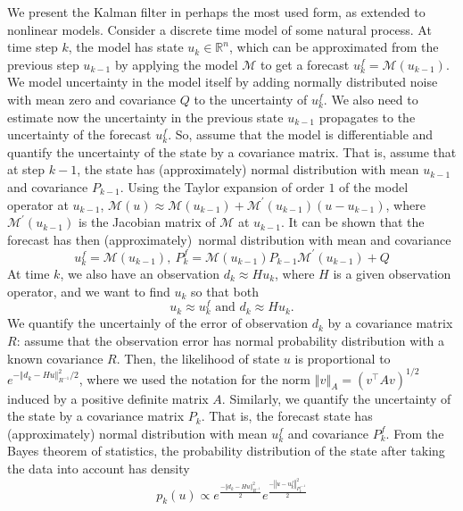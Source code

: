 \documentclass[12pt]{article}%
\begin{document}
We present the Kalman filter in perhaps the most used form, as extended to nonlinear models.
 Consider a discrete time model of some natural
process. At time step $k$, the model has state $u_{k}\in\mathbb{R}^{n}$, which
can be approximated from the previous step $u_{k-1}$ by applying the model
$\mathcal{M}$ to get a forecast $u_{k}^{f}=\mathcal{M}\left(  u_{k-1}\right)
$. We model uncertainty in the model itself by adding normally distributed
noise with mean zero and covariance $Q$ to the uncertainty of $u_{k}^{f}$. We
also need to estimate now the uncertainty in the previous state $u_{k-1}$
propagates to the uncertainty of the forecast $u_{k}^{f}$. So, assume that the
model is differentiable and quantify the uncertainty of the state by a
covariance matrix. That is,  assume that at step $k-1$, the state has
(approximately) normal distribution with mean $u_{k-1}$ and covariance
$P_{k-1}$. Using the Taylor expansion of order $1$ of the model operator at
$u_{k-1}$, $\mathcal{M}\left(  u\right)  \approx\mathcal{M}\left(
u_{k-1}\right)  +\mathcal{M}^{\prime}\left(  u_{k-1}\right)  \left(
u-u_{k-1}\right)  $, where $\mathcal{M}^{\prime}\left(  u_{k-1}\right)  $ is
the Jacobian matrix of $\mathcal{M}$ at $u_{k-1}$. It can be shown that the
forecast has then (approximately)\ normal distribution with mean and
covariance
$$
u_{k}^{f}=\mathcal{M}\left(  u_{k-1}\right)  ,\ P_{k}^{f}=\mathcal{M}\left(
u_{k-1}\right)  P_{k-1}\mathcal{M}^{\prime}\left(  u_{k-1}\right)  +Q
$$
At time $k$, we also have an observation $d_{k}\approx Hu_{k}$, where $H$ is a
given observation operator, and we want to find $u_{k}$ so that both
$$
u_{k}\approx u_{k}^{f}\text{ and }d_{k}\approx Hu_{k}.
$$
We quantify the uncertainly of the error of observation $d_{k}$ by a covariance
matrix $R$: assume that the observation error has normal probability
distribution with a known covariance $R$. Then, the likelihood of state $u$ is
proportional to $e^{-\left\Vert d_{k}-Hu\right\Vert _{R^{-1}}^{2}/2}$, where
we used the notation for the norm $\left\Vert v\right\Vert _{A}%
=\left(v^{\top}Av\right)^{1/2}$ induced by a positive definite matrix $A$. Similarly, we quantify the
uncertainty of the state by a covariance matrix $P_{k}$. That is, the forecast
state has (approximately) normal distribution with mean $u_{k}^{f}$  and covariance
$P_{k}^{f}$. From the Bayes theorem of statistics, the probability distribution
of the state after taking the data into account has density%
$$
p_{k}\left(  u\right) \propto e^\frac{-\left\Vert d_{k}
-Hu\right\Vert_{R^{-1}}^{2}}{2}e^\frac{-\left\Vert u-u_{k}^{f}\right\Vert _{
{P_{k}^f}^{-1}  }^{2}}{2}%
$$
\end{document}
